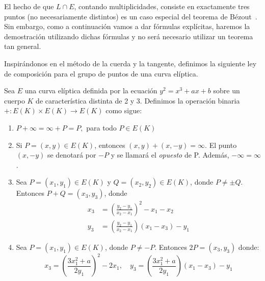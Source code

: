 \begin{nota}
El hecho de que $L \cap E$, contando multiplicidades, consiste en exactamente tres puntos (no necesariamente distintos) es un caso especial del teorema de Bézout~\cite[sec. I.7.8]{Hartshorne:1977}. Sin embargo, como a continuación vamos a dar fórmulas explícitas, haremos la demostración utilizando dichas fórmulas y no será necesario utilizar un teorema tan general.
\end{nota}

Inspirándonos en el método de la cuerda y la tangente, definimos la siguiente ley de composición para el grupo de puntos de una curva elíptica.

\begin{definicion}
\label{def:ley de grupo}
Sea $E$ una curva elíptica definida por la ecuación $y^2 = x^3 + a x + b$ sobre un cuerpo $K$ de característica distinta de 2 y 3. Definimos la operación binaria $+: E(K) \times E(K) \to E(K)$ como sigue:
\begin{enumerate}[label=\alph*)]
	\item $P + \infty = \infty + P = P,$ para todo $P \in E(K)$
	\item Si $P = (x, y) \in E(K)$, entonces $(x, y) + (x, -y) = \infty$. El punto $(x, -y)$ se denotará por $-P$ y se llamará el \emph{opuesto} de P. Además, $- \infty = \infty$.
	\item Sea $P = (x_1, y_1) \in E(K)$ y $Q = (x_2, y_2) \in E(K)$, donde $P \neq \pm Q$. Entonces $P + Q = (x_3, y_3)$, donde
	\begin{align*}
		x_3 &= \left(\frac{y_2 - y_1}{x_2 - x_1}\right)^2 - x_1 - x_2 \\
		y_3 &= \left(\frac{y_2 - y_1}{x_2 - x_1}\right) (x_1 - x_3) - y_1
	\end{align*}
	\item Sea $P = (x_1, y_1) \in E(K)$, donde $P \neq  -P$. Entonces $2 P = (x_3, y_3)$ donde:
	$$
	x_3 = \left(\frac{3 x_1^2 + a}{2 y_1}\right)^2 - 2 x_1, \quad
	y_3 = \left(\frac{3 x_1^2 + a}{2 y_1}\right) (x_1 - x_3) - y_1
	$$
\end{enumerate}
\end{definicion}
